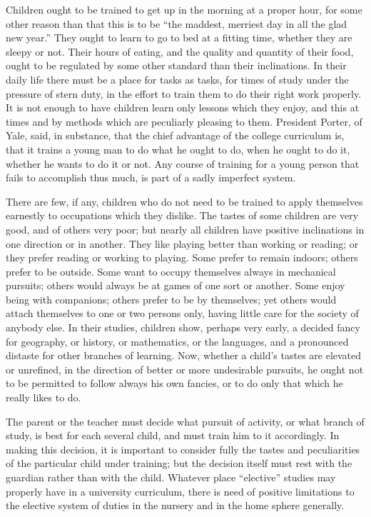 \documentclass[
]{book}
\begin{document}
Children ought to be trained to get up in the morning at a proper hour, for some other reason than that this is to be ``the maddest, merriest day in all the glad new year.'' They ought to learn to go to bed at a fitting time, whether they are sleepy or not. Their hours of eating, and the quality and quantity of their food, ought to be regulated by some other standard than their inclinations. In their daily life there must be a place for tasks as tasks, for times of study under the pressure of stern duty, in the effort to train them to do their right work properly. It is not enough to have children learn only lessons which they enjoy, and this at times and by methods which are peculiarly pleasing to them. President Porter, of Yale, said, in substance, that the chief advantage of the college curriculum is, that it trains a young man to do what he ought to do, when he ought to do it, whether he wants to do it or not. Any course of training for a young person that fails to accomplish thus much, is part of a sadly imperfect system.

There are few, if any, children who do not need to be trained to apply themselves earnestly to occupations which they dislike. The tastes of some children are very good, and of others very poor; but nearly all children have positive inclinations in one direction or in another. They like playing better than working or reading; or they prefer reading or working to playing. Some prefer to remain indoors; others prefer to be outside. Some want to occupy themselves always in mechanical pursuits; others would always be at games of one sort or another. Some enjoy being with companions; others prefer to be by themselves; yet others would attach themselves to one or two persons only, having little care for the society of anybody else. In their studies, children show, perhaps very early, a decided fancy for geography, or history, or mathematics, or the languages, and a pronounced distaste for other branches of learning. Now, whether a child's tastes are elevated or unrefined, in the direction of better or more undesirable pursuits, he ought not to be permitted to follow always his own fancies, or to do only that which he really likes to do.

The parent or the teacher must decide what pursuit of activity, or what branch of study, is best for each several child, and must train him to it accordingly. In making this decision, it is important to consider fully the tastes and peculiarities of the particular child under training; but the decision itself must rest with the guardian rather than with the child. Whatever place ``elective'' studies may properly have in a university curriculum, there is need of positive limitations to the elective system of duties in the nursery and in the home sphere generally.
\end{document}
